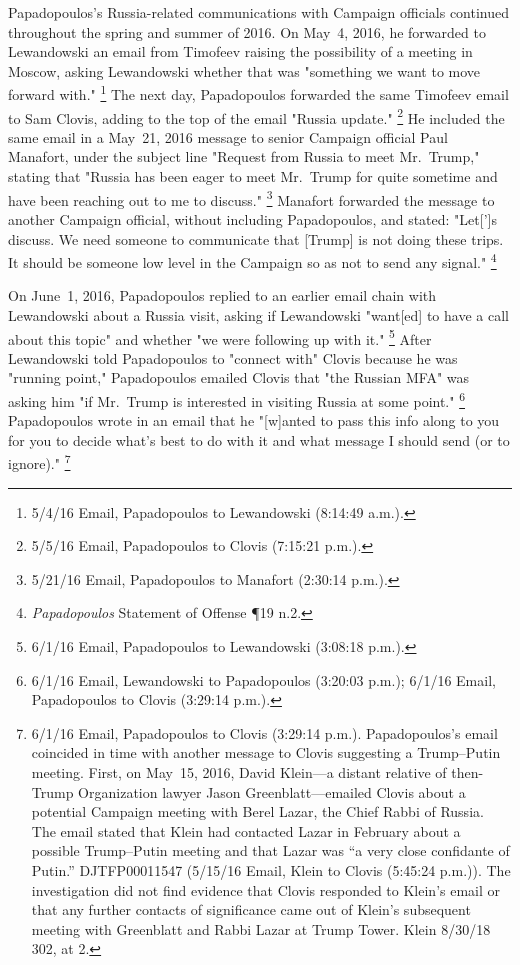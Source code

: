 Papadopoulos's Russia-related communications with Campaign officials continued throughout the spring and summer of 2016.
On May~4, 2016, he forwarded to Lewandowski an email from Timofeev raising the possibility of a meeting in Moscow, asking Lewandowski whether that was "something we want to move forward with."%
\footnote{5/4/16 Email, Papadopoulos to Lewandowski (8:14:49 a.m.).}
The next day, Papadopoulos forwarded the same Timofeev email to Sam Clovis, adding to the top of the email "Russia update."%
\footnote{5/5/16 Email, Papadopoulos to Clovis (7:15:21 p.m.).}
He included the same email in a May~21, 2016 message to senior Campaign official Paul Manafort, under the subject line "Request from Russia to meet Mr.~Trump," stating that "Russia has been eager to meet Mr.~Trump for quite sometime and have been reaching out to me to discuss."%
\footnote{5/21/16 Email, Papadopoulos to Manafort (2:30:14 p.m.).}
Manafort forwarded the message to another Campaign official, without including Papadopoulos, and stated: "Let[']s discuss.
We need someone to communicate that [Trump] is not doing these trips.
It should be someone low level in the Campaign so as not to send any signal."%
\footnote{\textit{Papadopoulos} Statement of Offense \P 19 n.2.}

On June~1, 2016, Papadopoulos replied to an earlier email chain with Lewandowski about a Russia visit, asking if Lewandowski "want[ed] to have a call about this topic" and whether "we were following up with it."%
\footnote{6/1/16 Email, Papadopoulos to Lewandowski (3:08:18 p.m.).}
After Lewandowski told Papadopoulos to "connect with" Clovis because he was "running point," Papadopoulos emailed Clovis that "the Russian MFA" was asking him "if Mr.~Trump is interested in visiting Russia at some point."%
\footnote{6/1/16 Email, Lewandowski to Papadopoulos (3:20:03 p.m.);
6/1/16 Email, Papadopoulos to Clovis (3:29:14 p.m.).}
Papadopoulos wrote in an email that he "[w]anted to pass this info along to you for you to decide what's best to do with it and what message I should send (or to ignore)."%
\footnote{6/1/16 Email, Papadopoulos to Clovis (3:29:14 p.m.).
Papadopoulos's email coincided in time with another message to Clovis suggesting a Trump--Putin meeting.
First, on May~15, 2016, David Klein---a distant relative of then-Trump Organization lawyer Jason Greenblatt---emailed Clovis about a potential Campaign meeting with Berel Lazar, the Chief Rabbi of Russia.
The email stated that Klein had contacted Lazar in February about a possible Trump--Putin meeting and that Lazar was “a very close confidante of Putin.”
DJTFP00011547 (5/15/16 Email, Klein to Clovis (5:45:24 p.m.)).
The investigation did not find evidence that Clovis responded to Klein's email or that any further contacts of significance came out of Klein's subsequent meeting with Greenblatt and Rabbi Lazar at Trump Tower.
Klein 8/30/18 302, at 2.}

